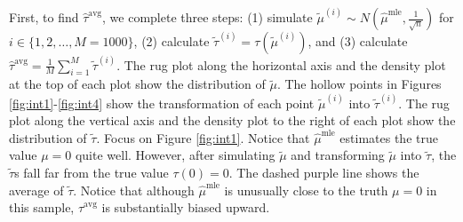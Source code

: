 \documentclass[11pt]{article}
\begin{document}
First, to find $\hat{\tau}^\text{avg}$, we complete three steps: (1) simulate $\tilde{\mu}^{(i)} \sim N \left( \hat{\mu}^\text{mle}, \frac{1}{\sqrt{n}} \right)$ for $i \in \{1, 2,\ldots, M = 1000\}$, (2) calculate $\tilde{\tau}^{(i)} = \tau\left( \tilde{\mu}^{(i)} \right)$, and (3) calculate $\hat{\tau}^\text{avg} = \frac{1}{M} \sum_{i = 1}^M \tilde{\tau}^{(i)}$.
The rug plot along the horizontal axis and the density plot at the top of each plot show the distribution of $\tilde{\mu}$.
The hollow points in Figures \ref{fig:int1}-\ref{fig:int4} show the transformation of each point $\tilde{\mu}^{(i)}$ into $\tilde{\tau}^{(i)}$.
The rug plot along the vertical axis and the density plot to the right of each plot show the distribution of $\tilde{\tau}$.
Focus on Figure \ref{fig:int1}.
Notice that $\hat{\mu}^\text{mle}$ estimates the true value $\mu = 0$ quite well.
However, after simulating $\tilde{\mu}$ and transforming $\tilde{\mu}$ into $\tilde{\tau}$, the $\tilde{\tau}$s fall far from the true value $\tau(0) = 0$.
The dashed purple line shows the average of $\tilde{\tau}$.
Notice that although $\hat{\mu}^\text{mle}$ is unusually close to the truth $\mu = 0$ in this sample, $\hat{\tau}^\text{avg}$ is substantially biased upward.
\end{document}
